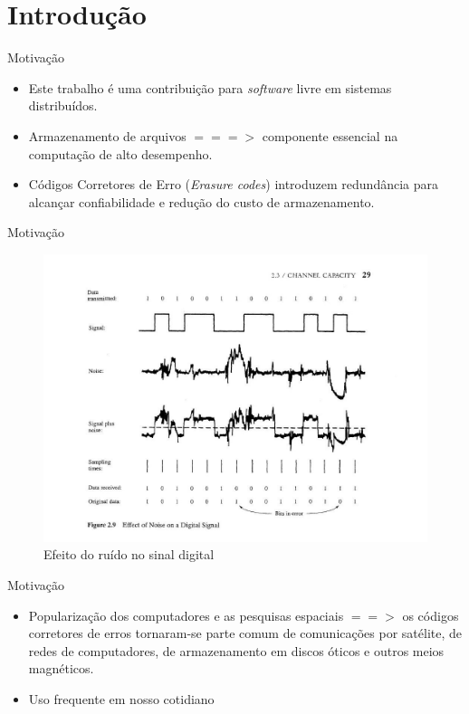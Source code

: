  \section{Introdução}

  \begin{frame}{Motivação}
     \begin{itemize}
      \item Este trabalho é uma contribuição para \emph{software} livre em sistemas distribuídos.
      \item Armazenamento de arquivos $===>$ componente essencial na computação de alto desempenho. 
      \item Códigos Corretores de Erro (\emph{Erasure codes}) introduzem redundância para alcançar confiabilidade e redução do custo de armazenamento.    
     \end{itemize}
  \end{frame}

  \begin{frame}{Motivação}
   \begin{figure}[h]
     \centering
     \includegraphics[scale=.25]{stalling-channel-capacity.jpg}
     \caption{Efeito do ruído no sinal digital \cite{Stallings:2005}}
     \label{fig1:ersd}
   \end{figure}
  \end{frame}

  \begin{frame}{Motivação}
     \begin{itemize}
         \item Popularização dos computadores e as pesquisas espaciais $==>$ os códigos corretores de erros tornaram-se parte comum de comunicações por satélite, de redes de computadores, de armazenamento em discos óticos e outros meios magnéticos.
         \item Uso frequente em nosso cotidiano
     \end{itemize}
  \end{frame}

